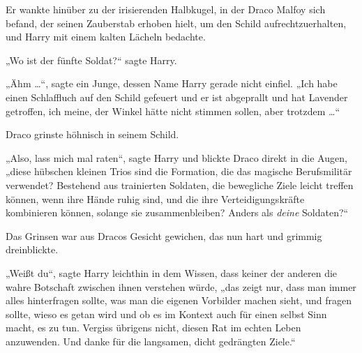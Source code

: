 Er wankte hinüber zu der irisierenden Halbkugel, in der Draco Malfoy sich befand, der seinen Zauberstab erhoben hielt, um den Schild aufrechtzuerhalten, und Harry mit einem kalten Lächeln bedachte.

„Wo ist der fünfte Soldat?“ sagte Harry.

„Ähm …“, sagte ein Junge, dessen Name Harry gerade nicht einfiel.
„Ich habe einen Schlaffluch auf den Schild gefeuert und er ist abgeprallt und hat Lavender getroffen, ich meine, der Winkel hätte nicht stimmen sollen, aber trotzdem …“

Draco grinste höhnisch in seinem Schild.

„Also, lass mich mal raten“, sagte Harry und blickte Draco direkt in die Augen, „diese hübschen kleinen Trios sind die Formation, die das magische Berufsmilitär verwendet? Bestehend aus trainierten Soldaten, die bewegliche Ziele leicht treffen können, wenn ihre Hände ruhig sind, und die ihre Verteidigungskräfte kombinieren können, solange sie zusammenbleiben? Anders als \emph{deine} Soldaten?“

Das Grinsen war aus Dracos Gesicht gewichen, das nun hart und grimmig dreinblickte.

„Weißt du“, sagte Harry leichthin in dem Wissen, dass keiner der anderen die wahre Botschaft zwischen ihnen verstehen würde, „das zeigt nur, dass man immer alles hinterfragen sollte, was man die eigenen Vorbilder machen sieht, und fragen sollte, wieso es getan wird und ob es im Kontext auch für einen selbst Sinn macht, es zu tun. Vergiss übrigens nicht, diesen Rat im echten Leben anzuwenden. Und danke für die langsamen, dicht gedrängten Ziele.“

